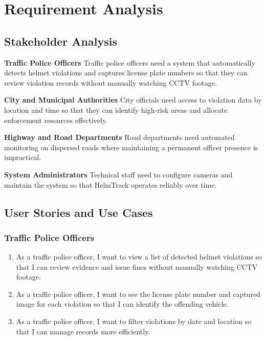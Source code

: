 \chapter{Requirement Analysis}
\label{chap:requirement-analysis}

\section{Stakeholder Analysis}
\label{section:stakeholder-analysis}

\textbf{Traffic Police Officers} Traffic police officers need a system that automatically detects helmet violations and captures license plate numbers so that they can review violation records without manually watching CCTV footage.

\textbf{City and Municipal Authorities} City officials need access to violation data by location and time so that they can identify high-risk areas and allocate enforcement resources effectively.

\textbf{Highway and Road Departments} Road departments need automated monitoring on dispersed roads where maintaining a permanent officer presence is impractical.

\textbf{System Administrators} Technical staff need to configure cameras and maintain the system so that HelmTrack operates reliably over time.

\section{User Stories and Use Cases}
\label{section:user-stories-use-cases}

\subsection{Traffic Police Officers}

\begin{enumerate}[leftmargin=80pt]
    \item As a traffic police officer, I want to view a list of detected helmet violations so that I can review evidence and issue fines without manually watching CCTV footage.
    \item As a traffic police officer, I want to see the license plate number and captured image for each violation so that I can identify the offending vehicle.
    \item As a traffic police officer, I want to filter violations by date and location so that I can manage records more efficiently.
\end{enumerate}

